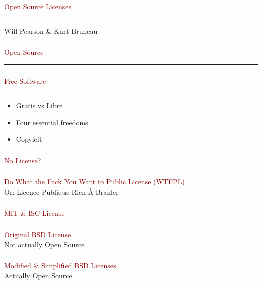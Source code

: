 \documentclass[c]{beamer}
\newcommand{\TITLE}{\fontsize{50pt}{1em}\selectfont}
\begin{document}
  \begin{frame}
    \frametitle{}
    \centering
    \textcolor{darkred}{{\TITLE Open Source Licenses}} \\
    \vspace{1em} \hrule \vspace{1em}
    Will Pearson \& Kurt Bruneau
  \end{frame}
  \begin{frame}
    \frametitle{}
    \textcolor{darkred}{{\TITLE Open Source}}
    \vspace{1em} \hrule \vspace{1em}
  \end{frame}
  \begin{frame}
    \frametitle{}
    \textcolor{darkred}{{\TITLE Free Software}} \\
    \vspace{1em} \hrule \vspace{1em}
    \LARGE
    \begin{itemize}
    \item Gratis vs Libre
    \item Four essential freedoms
    \item Copyleft
    \end{itemize}
  \end{frame}
  \begin{frame}
    \frametitle{}
    \textcolor{darkred}{{\TITLE No License?}} \\
  \end{frame}
  \begin{frame}
    \frametitle{}
    \textcolor{darkred}{{\TITLE Do What the Fuck You Want to Public License (WTFPL) \\}}
    Or: Licence Publique Rien À Branler \\
  \end{frame}
  \begin{frame}
    \frametitle{}
    \textcolor{darkred}{{\TITLE MIT \& ISC License \\}}
  \end{frame}
  \begin{frame}
    \frametitle{}
    \textcolor{darkred}{{\TITLE Original BSD License \\}}
    Not actually Open Source. \\
  \end{frame}
  \begin{frame}
    \frametitle{}
    \textcolor{darkred}{{\TITLE Modified \& Simplified BSD Licenses \\}}
    Actually Open Source. \\
  \end{frame}
\end{document}
